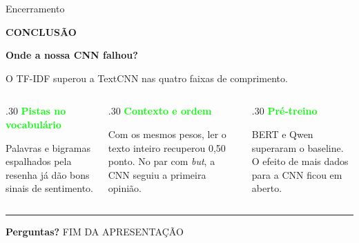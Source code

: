 \documentclass[t,aspectratio=169,11pt]{beamer}
\begin{document}
{
\begin{frame}[plain]{Encerramento}
\color{white}
\vfill
{\scriptsize\bfseries\color{Lime} CONCLUSÃO\par}
\vspace{2mm}
{\fontsize{23}{25}\selectfont\bfseries Onde a nossa CNN falhou?\par}
\vspace{2mm}
{\large O TF-IDF superou a TextCNN nas quatro faixas de comprimento.}
\par\vspace{3mm}
\begin{columns}[T,onlytextwidth]
\begin{column}{.30\textwidth}
\textcolor{Lime}{\bfseries Pistas no vocabulário}\par
{\small Palavras e bigramas espalhados pela resenha já dão bons sinais de sentimento.}
\end{column}
\begin{column}{.30\textwidth}
\textcolor{Lime}{\bfseries Contexto e ordem}\par
{\small Com os mesmos pesos, ler o texto inteiro recuperou 0,50 ponto. No par com \textit{but}, a CNN seguiu a primeira opinião.}
\end{column}
\begin{column}{.30\textwidth}
\textcolor{Lime}{\bfseries Pré-treino}\par
{\small BERT e Qwen superaram o baseline. O efeito de mais dados para a CNN ficou em aberto.}
\end{column}
\end{columns}
\vfill
{\color{Lime!62!Forest}\rule{\linewidth}{.5pt}\par}
{\Large\bfseries Perguntas?}\hfill{\scriptsize\color{Lime} FIM DA APRESENTAÇÃO}
\par\vspace{2mm}
\end{frame}
}

\appendix
\end{document}
